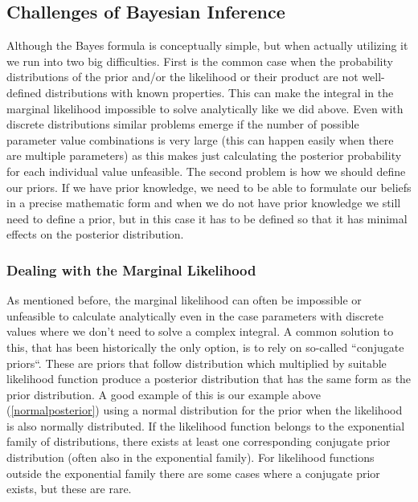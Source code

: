 \documentclass[12pt,a4paper,leqno]{report}
\theoremstyle{plain}
\theoremstyle{definition}
\theoremstyle{remark}
\begin{document}
\subsection{Challenges of Bayesian Inference}\label{bayesinferencechallenges}

Although the Bayes formula is conceptually simple, but when actually utilizing
it we run into two big difficulties. First is the common case when the
probability distributions of the prior and/or the likelihood or their product
are not well-defined distributions with known properties. This can make the
integral in the marginal likelihood impossible to solve analytically like we did
above. Even with discrete distributions similar problems emerge if the number of
possible parameter value combinations is very large (this can happen easily when
there are multiple parameters) as this makes just calculating the posterior
probability for each individual value unfeasible. The second problem is how we
should define our priors. If we have prior knowledge, we need to be able to
formulate our beliefs in a precise mathematic form and when we do not have prior knowledge we still
need to define a prior, but in this case it has to be defined so that it has
minimal effects on the posterior distribution.

\subsubsection{Dealing with the Marginal Likelihood}\label{marginallikehoodproblems}

As mentioned before, the marginal likelihood can often be impossible or
unfeasible to calculate analytically even in the case parameters with discrete
values where we don't need to solve a complex integral. A common solution to this,
that has been historically the only option, is to rely on so-called ``conjugate
priors``. These are priors that follow distribution which multiplied by
suitable likelihood function produce a posterior distribution that has the same
form as the prior distribution. A good example of this is our example above (\ref{normalposterior}) using a normal
distribution for the prior when the likelihood is also normally distributed. If
the likelihood function belongs to the exponential family of distributions, there
exists at least one corresponding conjugate prior distribution (often also in
the exponential family). For likelihood functions outside the exponential family
there are some cases where a conjugate prior exists, but these are rare.
\end{document}
